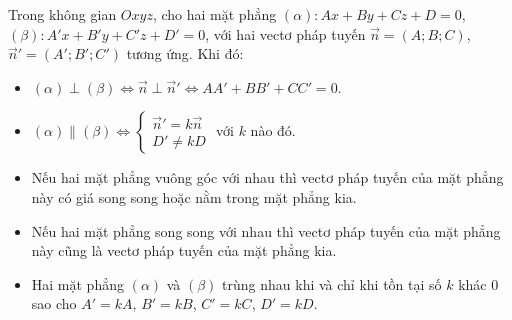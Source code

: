 \begin{congthuc}
Trong không gian $Oxyz$, cho hai mặt phẳng $(\alpha)\colon Ax+By+Cz+D=0$, $(\beta)\colon A'x+B'y+C'z+D'=0$, với hai vectơ pháp tuyến $\vec n=(A;B;C)$, $\vec n'=(A';B';C')$ tương ứng. Khi đó:
\begin{itemize}
  \item $(\alpha)\perp(\beta)\Leftrightarrow\vec n\perp\vec n'\Leftrightarrow AA'+BB'+CC'=0$.
  \item $(\alpha)\parallel(\beta)\Leftrightarrow\begin{cases}\vec n'=k\vec n\\D'\ne kD\end{cases}$ với $k$ nào đó.
\end{itemize}
\end{congthuc}

\begin{chuy}
\begin{itemize}
  \item Nếu hai mặt phẳng vuông góc với nhau thì vectơ pháp tuyến của mặt phẳng này có giá song song hoặc nằm trong mặt phẳng kia.
  \item Nếu hai mặt phẳng song song với nhau thì vectơ pháp tuyến của mặt phẳng này cũng là vectơ pháp tuyến của mặt phẳng kia.
  \item Hai mặt phẳng $(\alpha)$ và $(\beta)$ trùng nhau khi và chỉ khi tồn tại số $k$ khác $0$ sao cho $A'=kA$, $B'=kB$, $C'=kC$, $D'=kD$.
\end{itemize}
\end{chuy}

